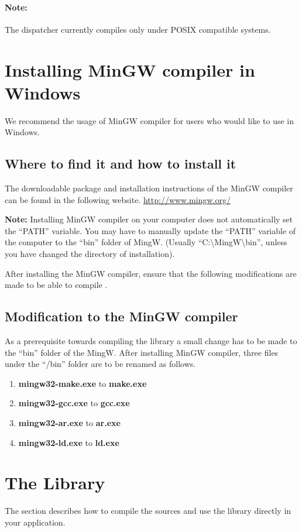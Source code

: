 \paragraph{Note:}
The dispatcher currently compiles only under POSIX compatible systems. 

\section*{Installing MinGW compiler in Windows}
We recommend the usage of MinGW compiler for users who would like to use \libalf in Windows. 

\subsection*{Where to find it and how to install it}
The downloadable package and installation instructions of the MinGW compiler can be found in the following website.
\url{http://www.mingw.org/} \vskip 1pt

\textbf{Note:} Installing MinGW compiler on your computer does not automatically set the ``PATH'' variable. You may have to manually update the “PATH” variable of the computer to the ``bin'' folder of MingW. (Usually ``C:\textbackslash MingW\textbackslash bin'', unless you have changed the directory of installation). 

After installing the MinGW compiler, ensure that the following modifications are made to be able to compile \libalf.

\subsection*{Modification to the MinGW compiler}

As a prerequisite towards compiling the library a small change has to be made to the ``bin'' folder of the MingW.   
After installing MinGW compiler, three files under the ``/bin'' folder are to be renamed as follows.
\begin{enumerate}
 \item \textbf{mingw32-make.exe} to \textbf{make.exe}
 \item \textbf{mingw32-gcc.exe} to \textbf{gcc.exe}
 \item \textbf{mingw32-ar.exe} to \textbf{ar.exe}
 \item \textbf{mingw32-ld.exe} to \textbf{ld.exe}	
\end{enumerate}
 
\section{The \libalf \cpp Library}
The section describes how to compile the sources and use the \cpp library directly in your application.
